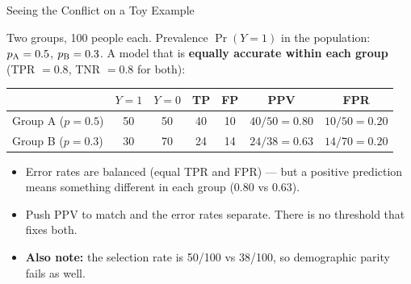 
\begin{frame}{Seeing the Conflict on a Toy Example}

    Two groups, 100 people each. Prevalence $\Pr(Y=1)$ in the population: $p_{\text{A}} = 0.5$,
    $p_{\text{B}} = 0.3$. A model that is \textbf{equally accurate within each group}
    (TPR $=0.8$, TNR $=0.8$ for both):

    \vspace{0.6em}
    \centering
    \small
    \begin{tabular}{lcccccc}
        \toprule
        & $Y=1$ & $Y=0$ & TP & FP & \textbf{PPV} & \textbf{FPR} \\
        \midrule
        Group A ($p=0.5$) & 50 & 50 & 40 & 10 & $40/50 = \mathbf{0.80}$ & $10/50 = \mathbf{0.20}$ \\
        Group B ($p=0.3$) & 30 & 70 & 24 & 14 & $24/38 = \mathbf{0.63}$ & $14/70 = \mathbf{0.20}$ \\
        \bottomrule
    \end{tabular}

    \vspace{1em}
    \raggedright

    \begin{itemize}\small
        \setlength\itemsep{0.35em}
        \item Error rates are balanced (equal TPR and FPR) --- but a positive prediction means
              something different in each group (0.80 vs 0.63).
        \item Push PPV to match and the error rates separate. There is no threshold that fixes both.
        \item \textbf{Also note:} the selection rate is 50/100 vs 38/100, so demographic parity
              fails as well.
    \end{itemize}
\end{frame}

